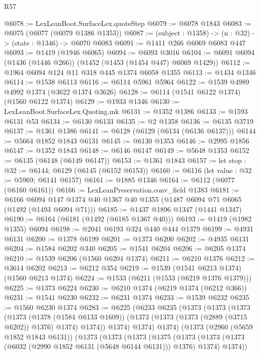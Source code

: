 \begin{lexlean}{R57}
\begin{coremodule}
@6078 := LexLeanBoot.SurfaceLex.quoteStep
@6079 := @6078 @1843
@6083 := @6075 (@6077 (@6079 @1386 @1353))
@6087 := (subject : @1358) -> (n : @32) -> (state : @1346) -> @6070 @6083
@6091 := @1411 @266 @6069 @6083 @447
@6093 := @1419 (@1946 @6065)
@6094 := @6093 @3016
@6104 := @6091 @6094 (@1436 (@1446 @266)) (@1452 (@1453 (@1454 @447) @6069 @1429))
@6112 := @1964 @6094 @124 @11 @318 @445 @1374 @6058 @1355
@6113 := @1434 @1346
@6114 := @1538 @6113
@6116 := @6114 @5961 @5964
@6122 := @1539 @4989 @4992 @1374 (@3622 @1374 @3626)
@6128 := @6114 (@1541 @6122 @1374) (@1560 @6122 @1374)
@6129 := @1933 @1346
@6130 := LexLeanBoot.SurfaceLex.Quoting.mk
@6131 := @1352 @1386
@6133 := @1593 @6131 @53
@6134 := @6130 @6133
@6135 := @2 @1358
@6136 := @6135 @3719
@6137 := @1361 @1386
@6141 := @6128 (@6129 (@6134 (@6136 @6137)))
@6144 := @5664 @1852 @1843 @6131
@6145 := @6130 @1353
@6146 := @2995 @1856
@6147 := @1352 @1843
@6148 := @6146 @6147
@6149 := @5648 @1353
@6152 := @6135 (@6148 (@6149 @6147))
@6153 := @1361 @1843
@6157 := let stop : @32 := @6144; @6129 (@6145 (@6152 @6153))
@6160 := @6116 (let value : @32 := @5969; @6141 @6157)
@6161 := @1885 @1346
@6164 := @6112 (@6077 (@6160 @6161))
@6166 := LexLeanPreservation.conv_field @1383
@6181 := @6166
    @6094
    @147
    @1374
    @40
    @1367
    @40
    @1355
    (@1487 @6094 @71 @6065 (@1492 (@1493 @6094 @71)))
@6185 := @1437 @1896 @1347 (@1441 @1347)
@6190 := @6164 (@6181 (@1492 (@6185 @1367 @40)))
@6193 := @1419 (@1982 @1355) @6094
@6198 := @2041 @6193 @324 @440 @444 @1379
@6199 := @4931 @6131
@6200 := @1378 @6199
@6201 := @1373 @6200
@6202 := @4935 @6131
@6204 := @1584 @6202 @340
@6205 := @1541 @6204
@6206 := @6205 @1374
@6210 := @1539 @6206 (@1560 @6204 @1374)
@6211 := @6210 @1376
@6212 := @3614 @6202
@6213 := @6212 @354
@6219 := @1539 (@1541 @6213 @1374) (@1560 @6213 @1374)
@6224 := @1533 (@6211 (@1533 (@6219 @1376 @1379)))
@6225 := @1373 @6224
@6230 := @6210 @1374 (@6219 @1374 (@6212 @366))
@6231 := @1541 @6230
@6232 := @6231 @1374
@6233 := @1539 @6232
@6235 := @1560 @6230 @1374
@6283 := @6225
    (@6233
      @6235
      (@1373
        (@1373
          (@1373
            (@1373
              (@1378 (@1584 @6133 @1609))
              (@1373 (@1373 (@1373 (@2889 (@3715 @6202)) @1376) @1374) @1374))
            @1374)
          @1374)
        @1374)
      (@1373
        (@2960 (@5659 @1852 @1843 @6131))
        (@1373
          (@1373
            (@1373
              (@1375
                (@1373
                  (@1373 (@1373 (@6032 (@2990 @1852 @6131 (@5648 @6144 @6131))) @1376) @1374)
                  @1374))

\end{coremodule}
\end{lexlean}
